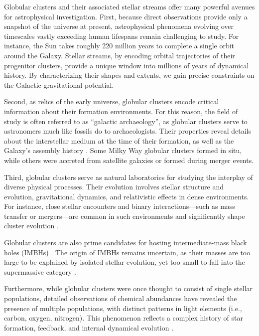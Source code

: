    Globular clusters and their associated stellar streams offer many powerful avenues for astrophysical investigation. First, because direct observations provide only a snapshot of the universe at present, astrophysical phenomena evolving over timescales vastly exceeding human lifespans remain challenging to study. For instance, the Sun takes roughly 220 million years to complete a single orbit around the Galaxy. Stellar streams, by encoding orbital trajectories of their progenitor clusters, provide a unique window into millions of years of dynamical history. By characterizing their shapes and extents, we gain precise constraints on the Galactic gravitational potential.

    Second, as relics of the early universe, globular clusters encode critical information about their formation environments. For this reason, the field of study is often referred to as ``galactic archaeology'', as globular clusters serve to astronomers much like fossils do to archaeologists. Their properties reveal details about the interstellar medium at the time of their formation, as well as the Galaxy's assembly history \citep{2021ApJ...909L..26B,2023A&A...673A..86P}. Some Milky Way globular clusters formed in situ, while others were accreted from satellite galaxies or formed during merger events.

    Third, globular clusters serve as natural laboratories for studying the interplay of diverse physical processes. Their evolution involves stellar structure and evolution, gravitational dynamics, and relativistic effects in dense environments. For instance, close stellar encounters and binary interactions—such as mass transfer or mergers—are common in such environments and significantly shape cluster evolution \citep{2004MNRAS.349..129D,2016MNRAS.458.1450W,2024MNRAS.528.5119A}. 

    Globular clusters are also prime candidates for hosting intermediate-mass black holes (IMBHs) \citep{2013MNRAS.432.2779B,2015MNRAS.454.3150G}. The origin of IMBHs remains uncertain, as their masses are too large to be explained by isolated stellar evolution, yet too small to fall into the supermassive category \citep{2020ARA&A..58..257G}.

    Furthermore, while globular clusters were once thought to consist of single stellar populations, detailed observations of chemical abundances have revealed the presence of multiple populations, with distinct patterns in light elements (i.e., carbon, oxygen, nitrogen). This phenomenon reflects a complex history of star formation, feedback, and internal dynamical evolution \citep{2008MNRAS.391..825D,2012A&ARv..20...50G,2018ARA&A..56...83B}. 

